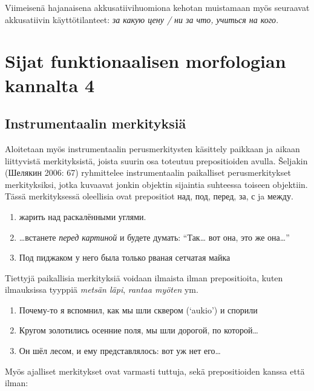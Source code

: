 \documentclass[]{scrreprt}
\providecommand{\tightlist}{%
  \setlength{\itemsep}{0pt}\setlength{\parskip}{0pt}}
\begin{document}
Viimeisenä hajanaisena akkusatiivihuomiona kehotan muistamaan myös
seuraavat akkusatiivin käyttötilanteet: \emph{за какую цену / ни за что,
учиться на кого}.

\chapter{Sijat funktionaalisen morfologian kannalta
4}\label{luento-10-sijat-funktionaalisen-morfologian-kannalta-4}


\section{Instrumentaalin
merkityksiä}\label{instrumentaalin-merkityksiuxe4}

Aloitetaan myös instrumentaalin perusmerkitysten käsittely paikkaan ja
aikaan liittyvistä merkityksistä, joista suurin osa toteutuu
prepositioiden avulla. Šeljakin (Шелякин 2006: 67) ryhmittelee
instrumentaalin paikalliset perusmerkitykset merkityksiksi, jotka
kuvaavat jonkin objektin sijaintia suhteessa toiseen objektiin. Tässä
merkityksessä oleellisia ovat prepositiot над, под, перед, за, с ja
между.

\begin{enumerate}
\def\labelenumi{(\arabic{enumi})}
\setcounter{enumi}{129}
\tightlist
\item
  жарить над раскалёнными углями.
\item
  \ldots{}встанете \emph{перед картиной} и будете думать: ``Так\ldots{}
  вот она, это же она\ldots{}''
\item
  Под пиджаком у него была только рваная сетчатая майка
\end{enumerate}

Tiettyjä paikallisia merkityksiä voidaan ilmaista ilman prepositioita,
kuten ilmauksissa tyyppiä \emph{metsän läpi}, \emph{rantaa myöten} ym.

\begin{enumerate}
\def\labelenumi{(\arabic{enumi})}
\setcounter{enumi}{132}
\tightlist
\item
  Почему-то я вспомнил, как мы шли сквером (`aukio') и спорили
\item
  Кругом золотились осенние поля, мы шли дорогой, по которой\ldots{}
\item
  Он шёл лесом, и ему представлялось: вот уж нет его\ldots{}
\end{enumerate}

Myös ajalliset merkitykset ovat varmasti tuttuja, sekä prepositioiden
kanssa että ilman:
\end{document}
